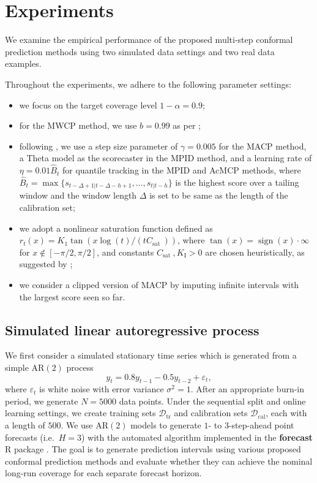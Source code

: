 \documentclass[
  11pt,
  a4paper,
]{article}
\providecommand{\tightlist}{%
  \setlength{\itemsep}{0pt}\setlength{\parskip}{0pt}}\usepackage{longtable,booktabs,array}
\theoremstyle{plain}
\theoremstyle{remark}
\begin{document}
\section{Experiments}\label{experiments}

We examine the empirical performance of the proposed multi-step
conformal prediction methods using two simulated data settings and two
real data examples.

Throughout the experiments, we adhere to the following parameter
settings:

\begin{itemize}
\tightlist
\item
  we focus on the target coverage level \(1-\alpha=0.9\);
\item
  for the MWCP method, we use \(b=0.99\) as per \textcite{barber2023};
\item
  following \textcite{angelopoulos2024}, we use a step size parameter of
  \(\gamma=0.005\) for the MACP method, a Theta model as the scorecaster
  in the MPID method, and a learning rate of \(\eta=0.01\hat{B}_t\) for
  quantile tracking in the MPID and AcMCP methods, where
  \(\hat{B}_t=\max\{s_{t-\Delta+1|t-\Delta-h+1},\dots,s_{t|t-h}\}\) is
  the highest score over a tailing window and the window length
  \(\Delta\) is set to be same as the length of the calibration set;
\item
  we adopt a nonlinear saturation function defined as
  \(r_t(x)=K_1 \tan \left(x \log (t) / (t C_{\text {sat }})\right)\),
  where \(\tan (x)=\operatorname{sign}(x) \cdot \infty\) for
  \(x \notin[-\pi / 2, \pi / 2]\), and constants
  \(C_{\text {sat }}, K_{\mathrm{I}}>0\) are chosen heuristically, as
  suggested by \textcite{angelopoulos2024};
\item
  we consider a clipped version of MACP by imputing infinite intervals
  with the largest score seen so far.
\end{itemize}

\subsection{Simulated linear autoregressive
process}\label{simulated-linear-autoregressive-process}

We first consider a simulated stationary time series which is generated
from a simple AR\((2)\) process \[
y_t = 0.8y_{t-1} - 0.5y_{t-2} + \varepsilon_t,
\] where \(\varepsilon_t\) is white noise with error variance
\(\sigma^2 = 1\). After an appropriate burn-in period, we generate
\(N=5000\) data points. Under the sequential split and online learning
settings, we create training sets \(\mathcal{D}_{\text{tr}}\) and
calibration sets \(\mathcal{D}_{\text{cal}}\), each with a length of
\(500\). We use AR\((2)\) models to generate \(1\)- to \(3\)-step-ahead
point forecasts (i.e.~\(H=3\)) with the automated algorithm implemented
in the \textbf{forecast} R package
\autocite{hyndman2024}.
The goal is to generate prediction intervals using various proposed
conformal prediction methods and evaluate whether they can achieve the
nominal long-run coverage for each separate forecast horizon.
\end{document}
